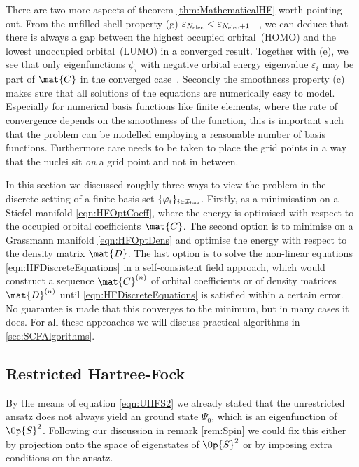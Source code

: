 \begin{rem}
There are two more aspects of theorem \ref{thm:MathematicalHF} worth pointing out.
From the unfilled shell property (g) $\varepsilon_{N_\text{elec}} < \varepsilon_{N_\text{elec}+1}$%
~\cite{Bach1994},
we can deduce that there is always a gap between the
highest occupied orbital~(HOMO) and the lowest unoccupied orbital~(LUMO)
in a converged \HF result.
Together with (e), we see that only eigenfunctions $\psi_i$
with negative orbital energy eigenvalue $\varepsilon_i$ may be part of $\mat{C}$
in the converged case~\cite{Lions1989}.
Secondly the smoothness property (c) makes sure that
all solutions of the \HF equations are numerically easy to model.
Especially for numerical basis functions like finite elements,
where the rate of convergence depends on the smoothness of the function,
this is important such that the problem can be modelled
employing a reasonable number of basis functions.
Furthermore care needs to be taken to place the grid points
in a way that the nuclei sit \emph{on} a grid point and not in between.
\end{rem}

In this section we discussed roughly three ways to view the \HF
problem in the discrete setting of a finite basis set $\{\varphi_i\}_{i\in\mathcal{I}_\text{bas}}$.
Firstly, as a minimisation on a Stiefel manifold \eqref{eqn:HFOptCoeff},
where the energy is optimised with respect to the occupied orbital coefficients
$\mat{C}$.
The second option is to minimise on a Grassmann manifold \eqref{eqn:HFOptDens}
and optimise the energy with respect to the density matrix $\mat{D}$.
The last option is to solve the non-linear \HF equations
\eqref{eqn:HFDiscreteEquations}
in a self-consistent field approach,
which would construct a sequence $\mat{C}^{(n)}$
of orbital coefficients or of density matrices $\mat{D}^{(n)}$
until \eqref{eqn:HFDiscreteEquations} is satisfied within a certain error.
No guarantee is made that this converges to the minimum,
but in many cases it does.
For all these approaches we will discuss practical
algorithms in \vref{sec:SCFAlgorithms}.

\subsection{Restricted Hartree-Fock}
By the means of equation \eqref{eqn:UHFS2}
we already stated
that the unrestricted \HF ansatz does not always
yield an \HF ground state $\Psi_0$,
which is an eigenfunction of $\Op{S}^2$.
Following our discussion in remark \vref{rem:Spin}
we could fix this either by projection onto the space of eigenstates
of $\Op{S}^2$ or by imposing extra conditions on the \HF ansatz.

